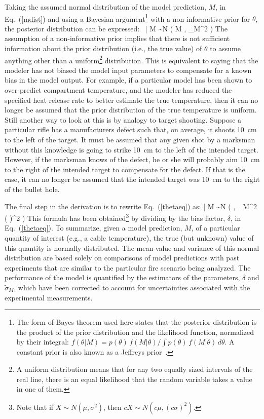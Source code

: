 \ee
Taking the assumed normal distribution of the model prediction, $M$, in Eq.~(\ref{mdist}) and using
a Bayesian argument\footnote{The form of Bayes theorem used here states that the posterior distribution is the product of
the prior distribution and the likelihood function, normalized by their integral:
$f(\theta|M)= p(\theta) \, f(M|\theta)/\int p(\theta) \, f(M|\theta) \, d\theta$.
A constant prior is also known as a Jeffreys prior~\cite{Gelman:Stats}.}
with a non-informative prior for $\theta$, the posterior distribution can be expressed:
\be
   \delta \, \theta \; | \; M \sim N \left( M \; , \; \sigma_M^2 \right) \label{thetaeq}
\ee
The assumption of a non-informative prior implies that there is not sufficient information about the
prior distribution (i.e., the true value) of
$\theta$ to assume anything other than a uniform\footnote{A uniform distribution means that for any two equally sized intervals of the real line,
there is an equal likelihood that the random variable takes a value in one of them.} distribution.
This is equivalent to saying that the modeler has not biased the model input parameters to compensate for a known
bias in the model output. For example, if a particular model has been shown to over-predict compartment temperature, and the modeler has reduced the specified heat release
rate to better estimate the true temperature, then it can no longer be assumed that the prior distribution of the true temperature is uniform.
Still another way to look at this is by analogy to target shooting. Suppose a particular rifle
has a manufacturers defect such that, on average, it shoots 10~cm to the left of the target. It must be assumed that any given shot by a marksman without this knowledge is
going to strike 10~cm to the left of the intended target. However, if the marksman knows of the defect, he or she will probably aim 10~cm to the right of the
intended target to compensate for the defect. If that is the case, it can no longer be assumed that the intended target was 10~cm to the right of the bullet hole.

The final step in the derivation is to rewrite Eq.~(\ref{thetaeq}) as:
\be
   \theta \; | \; M \sim N \left(  \; , \; \widetilde{\sigma}_M^2 \left(  \right)^2 \right) \label{truth}
\ee
This formula has been obtained\footnote{Note that if $X \sim N(\mu,\sigma^2)$, then
$cX \sim N ( c \mu , (c \sigma)^2)$.} by dividing by the bias factor, $\delta$, in Eq.~(\ref{thetaeq}). To summarize, given a model prediction, $M$,
of a particular quantity of interest (e.g., a cable temperature), the true (but unknown) value of this quantity is normally distributed. The mean value
and variance of this normal distribution are based solely on comparisons of model predictions with past experiments that are similar to the particular fire
scenario being analyzed. The performance of the model is quantified by the estimators of the parameters, $\delta$ and $\widetilde{\sigma}_M$, which
have been corrected to account for uncertainties associated with the experimental measurements.

